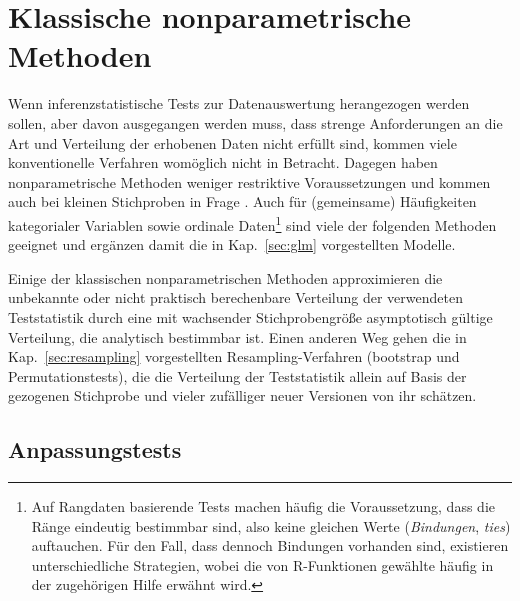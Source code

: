 \chapter{Klassische nonparametrische Methoden}
\label{sec:bioStat}

Wenn inferenzstatistische Tests zur Datenauswertung herangezogen werden sollen, aber davon ausgegangen werden muss, dass strenge Anforderungen an die Art und Verteilung der erhobenen Daten nicht erfüllt sind, kommen viele konventionelle Verfahren womöglich nicht in Betracht. Dagegen haben nonparametrische Methoden weniger restriktive Voraussetzungen und kommen auch bei kleinen Stichproben in Frage \cite{Bortz2008a, Buning1994}. Auch für (gemeinsame) Häufigkeiten kategorialer Variablen sowie ordinale Daten\footnote{Auf Rangdaten basierende Tests machen häufig die Voraussetzung, dass die Ränge eindeutig bestimmbar sind, also keine gleichen Werte (\emph{Bindungen}, \emph{ties}) auftauchen. Für den Fall, dass dennoch Bindungen vorhanden sind, existieren unterschiedliche Strategien, wobei die von R-Funktionen gewählte häufig in der zugehörigen Hilfe erwähnt wird.} sind viele der folgenden Methoden geeignet und ergänzen damit die in Kap.\ \ref{sec:glm} vorgestellten Modelle.

Einige der klassischen nonparametrischen Methoden approximieren die unbekannte oder nicht praktisch berechenbare Verteilung der verwendeten Teststatistik durch eine mit wachsender Stichprobengröße asymptotisch gültige Verteilung, die analytisch bestimmbar ist. Einen anderen Weg gehen die in Kap.\ \ref{sec:resampling} vorgestellten Resampling-Verfahren (bootstrap und Permutationstests), die die Verteilung der Teststatistik allein auf Basis der gezogenen Stichprobe und vieler zufälliger neuer Versionen von ihr schätzen.

\section{Anpassungstests}
\label{sec:modelTests}

